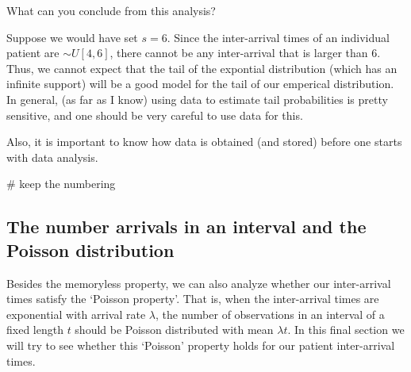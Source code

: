 \begin{exercise}
What can you conclude from this analysis?
  \begin{solution}
    Suppose we would have set $s=6$.
    Since the inter-arrival times of an individual patient are $\sim U[4, 6]$, there cannot be any inter-arrival that is larger than $6$.
    Thus, we cannot expect that the tail of the expontial distribution (which has an infinite support) will be a good model for the tail of our emperical distribution.
    In general, (as far as I know) using data to estimate tail probabilities is pretty sensitive, and one should be very careful to use data for this.

    Also, it is important to know how data is obtained (and stored) before one starts with data analysis.

\begin{pyverbatim}
# keep the numbering
\end{pyverbatim}
  \end{solution}
\end{exercise}


\subsection{The number arrivals in an interval and the Poisson distribution}

Besides the memoryless property, we can also analyze whether our inter-arrival times satisfy the `Poisson property'.
That is, when the inter-arrival times are exponential with arrival rate $\lambda$, the number of observations in an interval of a fixed length $t$ should be Poisson distributed with mean $\lambda t$.  In this final section we will try to see whether this `Poisson' property holds for our patient inter-arrival times.

